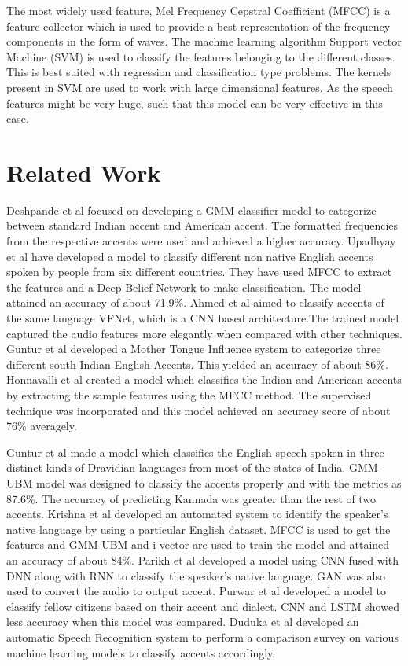 \documentclass[pdflatex]{sn-jnl}%
\theoremstyle{thmstyleone}%
\theoremstyle{thmstyletwo}%
\theoremstyle{thmstylethree}%
\begin{document}
The most widely used feature, Mel Frequency Cepstral Coefficient (MFCC) is a feature collector which is used to provide a best representation of the frequency components in the form of waves. The machine learning algorithm Support vector Machine (SVM) is used to classify the features belonging to the different classes. This is best suited with regression and classification type problems. The kernels present in SVM are used to work with large dimensional features. As the speech features might be very huge, such that this model can be very effective in this case.  

\section{Related Work}\label{sec2}
Deshpande et al \cite{b6} focused on developing a GMM classifier model to categorize between standard Indian accent and American accent. The formatted frequencies from the respective accents were used and achieved a higher accuracy. Upadhyay et al \cite{b7} have developed a model to classify different non native English accents spoken by people from six different countries. They have used MFCC to extract the features and a Deep Belief Network to make classification. The model attained an
accuracy of about 71.9\%. Ahmed et al \cite{b8} aimed to classify accents of the same language VFNet, which is a CNN based architecture.The trained model captured the audio features more elegantly when compared with other techniques. Guntur et al \cite{b9} developed a Mother Tongue Influence system to categorize three different south Indian English Accents. This yielded an accuracy of about 86\%. Honnavalli et al \cite{b10} created a model which classifies the	Indian and American accents by extracting the sample features using the MFCC method. The supervised technique was incorporated and this model achieved an accuracy score of about 76\% averagely. 

Guntur et al \cite{b11} made a model which
classifies the English speech spoken in three distinct kinds of Dravidian languages from most of the states of India. GMM-
UBM model was designed to classify the accents properly
and with the metrics as 87.6\%. The accuracy of predicting
Kannada was greater than the rest of two accents. Krishna et al \cite{b12} developed an automated system to identify the speaker’s native language by using a particular English dataset. MFCC is used to get the features and GMM-UBM and i-vector are used to train the model and attained an accuracy of about 84\%. Parikh et al \cite{b13} developed a model using CNN fused with DNN along with RNN to classify the speaker’s native language. GAN was also used to convert the audio to output accent. Purwar et al \cite{b14} developed a model to classify fellow citizens based on their accent and dialect. CNN and LSTM showed less accuracy when this model was compared. Duduka et al \cite{b15} developed an automatic Speech Recognition system to perform a comparison survey on various machine learning models to classify accents accordingly. 
\end{document}
